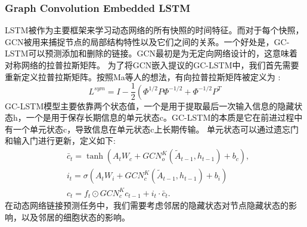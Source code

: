 \documentclass[conference]{IEEEtran}
\begin{document}
\subsubsection{Graph Convolution Embedded LSTM}
LSTM被作为主要框架来学习动态网络的所有快照的时间特征。而对于每个快照，GCN被用来捕捉节点的局部结构特性以及它们之间的关系。一个好处是，GC-LSTM可以预测添加和删除的链接。GCN最初是为无定向网络设计的，这意味着对称网络的拉普拉斯矩阵。
为了将GCN嵌入提议的GC-LSTM中，我们首先需要重新定义拉普拉斯矩阵。按照Ma等人的想法，有向拉普拉斯矩阵被定义为 :
\begin{equation}
	L^{s y m}=I-\frac{1}{2}\left(\Phi^{1 / 2} P \Phi^{-1 / 2}+\Phi^{-1 / 2} P^{T}\right.
\end{equation}
GC-LSTM模型主要依靠两个状态值，一个是用于提取最后一次输入信息的隐藏状态h，一个是用于保存长期信息的单元状态c。GC-LSTM的本质是它在前进过程中有一个单元状态c，导致信息在单元状态c上长期传输。
单元状态可以通过遗忘门和输入门进行更新，定义如下:
\begin{equation}
\begin{aligned}
	&\bar{c}_{t}=\tanh \left(A_{t} W_{c}+G C N_{o}^{K}\left(\tilde{A}_{t-1}, h_{t-1}\right)+b_{c}\right), \\
	&i_{t}=\sigma\left(A_{t} W_{i}+G C N_{c}^{K}\left(\tilde{A}_{t-1}, h_{t-1}\right)+b_{i}\right) \\
	&c_{t}=f_{t} \odot G C N_{c}^{K} c_{t-1}+i_{t} \cdot \bar{c}_{t} .
\end{aligned}
\end{equation}
在动态网络链接预测任务中，我们需要考虑邻居的隐藏状态对节点隐藏状态的影响，以及邻居的细胞状态的影响。
\end{document}
